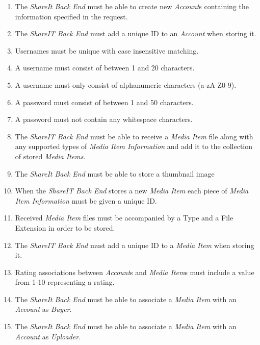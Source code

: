 \documentclass[../report.tex]{subfiles}
\begin{document}
\begin{enumerate}[label=\textbf{FR-\twodigits*},resume]

\item The \textit{ShareIt Back End} must be able to create new \textit{Account}s containing the information specified in the request.

\item The \textit{ShareIT Back End} must add a unique ID to an \textit{Account} when storing it.

\item Usernames must be unique with case insensitive matching.

\item A username must consist of between 1 and 20 characters.

\item A username must only consist of alphanumeric characters (a-zA-Z0-9).

\item A password must consist of between 1 and 50 characters. 

\item A password must not contain any whitespace characters.

\item The \textit{ShareIT Back End} must be able to receive a \textit{Media Item} file along with any supported types of \textit{Media Item Information} and add it to the collection of stored \textit{Media Items}.

\item The \textit{ShareIt Back End} must be able to store a thumbnail image

\item When the \textit{ShareIT Back End} stores a new \textit{Media Item} each piece of \textit{Media Item Information} must be given a unique ID.

\item Received \textit{Media Item} files must be accompanied by a Type and a File Extension in order to be stored.

\item The \textit{ShareIT Back End} must add a unique ID to a \textit{Media Item} when storing it.

\item Rating associations between \textit{Account}s and \textit{Media Item}s must include a value from 1-10 representing a rating.

\item The \textit{ShareIt Back End} must be able to associate a \textit{Media Item} with an \textit{Account} as \textit{Buyer}.

\item The \textit{ShareIt Back End} must be able to associate a \textit{Media Item} with an \textit{Account} as \textit{Uploader}.
\end{enumerate}
\end{document}
